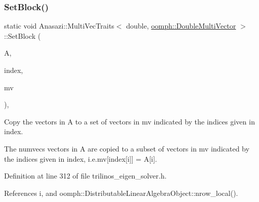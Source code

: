 \subsubsection{\texorpdfstring{Set\+Block()}{SetBlock()}\hspace{0.1cm}{\footnotesize\ttfamily [1/2]}}
{\footnotesize\ttfamily static void Anasazi\+::\+Multi\+Vec\+Traits$<$ double, \hyperlink{classoomph_1_1DoubleMultiVector}{oomph\+::\+Double\+Multi\+Vector} $>$\+::Set\+Block (\begin{DoxyParamCaption}\item[{const \hyperlink{classoomph_1_1DoubleMultiVector}{oomph\+::\+Double\+Multi\+Vector} \&}]{A,  }\item[{const std\+::vector$<$ int $>$ \&}]{index,  }\item[{\hyperlink{classoomph_1_1DoubleMultiVector}{oomph\+::\+Double\+Multi\+Vector} \&}]{mv }\end{DoxyParamCaption})\hspace{0.3cm}{\ttfamily [inline]}, {\ttfamily [static]}}



Copy the vectors in {\ttfamily A} to a set of vectors in {\ttfamily mv} indicated by the indices given in {\ttfamily index}. 

The {\ttfamily numvecs} vectors in {\ttfamily A} are copied to a subset of vectors in {\ttfamily mv} indicated by the indices given in {\ttfamily index}, i.\+e.{\ttfamily  mv\mbox{[}index\mbox{[}i\mbox{]}\mbox{]} = A\mbox{[}i\mbox{]}}. 

Definition at line 312 of file trilinos\+\_\+eigen\+\_\+solver.\+h.



References i, and oomph\+::\+Distributable\+Linear\+Algebra\+Object\+::nrow\+\_\+local().

\mbox{\label{classAnasazi_1_1MultiVecTraits_3_01double_00_01oomph_1_1DoubleMultiVector_01_4_a72a2dfbb096511d602ef03d0ec29b50a}} 
